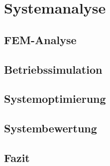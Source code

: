 \chapter{Systemanalyse}\label{sec:simulation}


\section{FEM-Analyse}

\section{Betriebssimulation}

\section{Systemoptimierung}

\section{Systembewertung}

\section{Fazit}